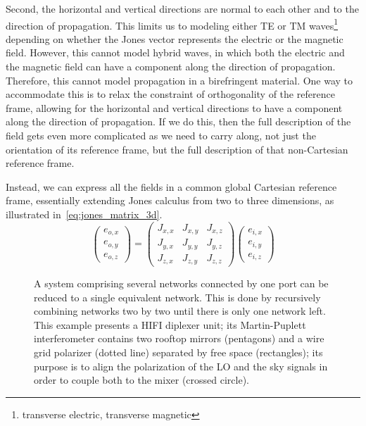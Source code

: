 \documentclass[journal]{IEEEtran}
\begin{document}
Second, the horizontal and vertical directions are normal to each other and to the direction of propagation.
This limits us to modeling either TE or TM waves\footnote{transverse electric, transverse magnetic} depending on whether the Jones vector represents the electric or the magnetic field.
However, this cannot model hybrid waves, in which both the electric and the magnetic field can have a component along the direction of propagation.
Therefore, this cannot model propagation in a birefringent material.
One way to accommodate this is to relax the constraint of orthogonality of the reference frame, allowing for the horizontal and vertical directions to have a component along the direction of propagation.
If we do this, then the full description of the field gets even more complicated as we need to carry along, not just the orientation of its reference frame, but the full description of that non-Cartesian reference frame.

Instead, we can express all the fields in a common global Cartesian reference frame, essentially extending Jones calculus from two to three dimensions, as illustrated in~\eqref{eq:jones_matrix_3d}.
\begin{equation}
    \begin{pmatrix}
        e_{o, x}\\
        e_{o, y}\\
        e_{o, z}
    \end{pmatrix}
    =
    \begin{pmatrix}
        J_{x, x}   &   J_{x, y}   &   J_{x, z} \\
        J_{y, x}   &   J_{y, y}   &   J_{y, z} \\
        J_{z, x}   &   J_{z, y}   &   J_{z, z}
    \end{pmatrix}
    \begin{pmatrix}
        e_{i, x}\\
        e_{i, y}\\
        e_{i, z}
    \end{pmatrix}
    \label{eq:jones_matrix_3d}
\end{equation}

\begin{figure} %
    \centering
    
    \caption{
    A system comprising several networks connected by one port can be reduced to a single equivalent network.
    This is done by recursively combining networks two by two until there is only one network left.
    This example presents a HIFI diplexer unit; its Martin-Puplett interferometer contains two rooftop mirrors (pentagons) and a wire grid polarizer (dotted line) separated by free space (rectangles); its purpose is to align the polarization of the LO and the sky signals in order to couple both to the mixer (crossed circle).
    }%
    \label{fig:cascading_example}
\end{figure}
\end{document}
